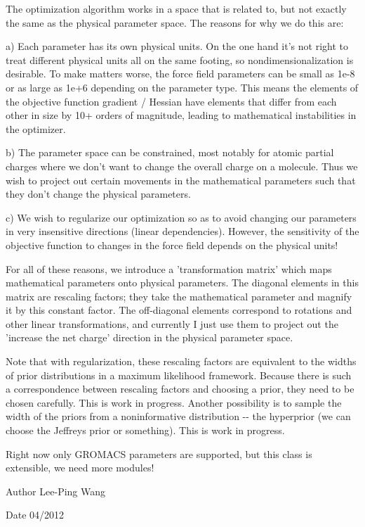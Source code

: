 \-The optimization algorithm works in a space that is related to, but not exactly the same as the physical parameter space. \-The reasons for why we do this are\-:

a) \-Each parameter has its own physical units. \-On the one hand it's not right to treat different physical units all on the same footing, so nondimensionalization is desirable. \-To make matters worse, the force field parameters can be small as 1e-\/8 or as large as 1e+6 depending on the parameter type. \-This means the elements of the objective function gradient / \-Hessian have elements that differ from each other in size by 10+ orders of magnitude, leading to mathematical instabilities in the optimizer.

b) \-The parameter space can be constrained, most notably for atomic partial charges where we don't want to change the overall charge on a molecule. \-Thus we wish to project out certain movements in the mathematical parameters such that they don't change the physical parameters.

c) \-We wish to regularize our optimization so as to avoid changing our parameters in very insensitive directions (linear dependencies). \-However, the sensitivity of the objective function to changes in the force field depends on the physical units!

\-For all of these reasons, we introduce a 'transformation matrix' which maps mathematical parameters onto physical parameters. \-The diagonal elements in this matrix are rescaling factors; they take the mathematical parameter and magnify it by this constant factor. \-The off-\/diagonal elements correspond to rotations and other linear transformations, and currently \-I just use them to project out the 'increase the net charge' direction in the physical parameter space.

\-Note that with regularization, these rescaling factors are equivalent to the widths of prior distributions in a maximum likelihood framework. \-Because there is such a correspondence between rescaling factors and choosing a prior, they need to be chosen carefully. \-This is work in progress. \-Another possibility is to sample the width of the priors from a noninformative distribution -\/-\/ the hyperprior (we can choose the \-Jeffreys prior or something). \-This is work in progress.

\-Right now only \-G\-R\-O\-M\-A\-C\-S parameters are supported, but this class is extensible, we need more modules!

\begin{DoxyAuthor}{\-Author}
\-Lee-\/\-Ping \-Wang 
\end{DoxyAuthor}
\begin{DoxyDate}{\-Date}
04/2012 
\end{DoxyDate}


